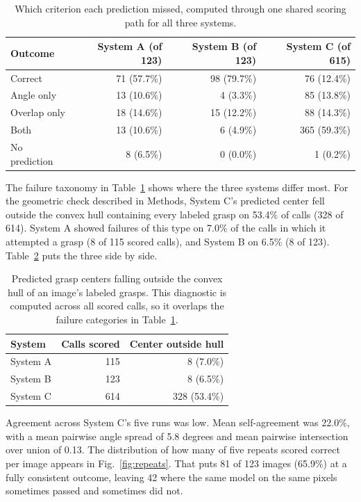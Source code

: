 \documentclass[12pt,letterpaper]{article}
\begin{document}
\begin{table}[H]
\centering
\caption{Which criterion each prediction missed, computed through one
shared scoring path for all three systems.}
\label{tab:taxonomy}
\begin{tabular}{lrrr}
\toprule
Outcome & System A (of 123) & System B (of 123) & System C (of 615) \\
\midrule
Correct       & 71 (57.7\%) & 98 (79.7\%) & 76 (12.4\%) \\
Angle only    & 13 (10.6\%) &  4 (3.3\%)  & 85 (13.8\%) \\
Overlap only  & 18 (14.6\%) & 15 (12.2\%) & 88 (14.3\%) \\
Both          & 13 (10.6\%) &  6 (4.9\%)  & 365 (59.3\%) \\
No prediction &  8 (6.5\%)  &  0 (0.0\%)  & 1 (0.2\%) \\
\bottomrule
\end{tabular}
\end{table}

The failure taxonomy in Table~\ref{tab:taxonomy} shows where the three
systems differ most. For the geometric check described in Methods,
System C's predicted center fell outside the convex hull containing
every labeled grasp on 53.4\% of calls (328 of 614). System A showed
failures of this type on 7.0\% of the calls in which it attempted a
grasp (8 of 115 scored calls), and System B on 6.5\% (8 of 123).
Table~\ref{tab:hull} puts the three side by side.

\begin{table}[H]
\centering
\caption{Predicted grasp centers falling outside the convex hull of an
image's labeled grasps. This diagnostic is computed across all scored calls, so it overlaps the failure categories in Table~\ref{tab:taxonomy}.}
\label{tab:hull}
\begin{tabular}{lrr}
\toprule
System & Calls scored & Center outside hull \\
\midrule
System A &  115 &   8 (7.0\%)  \\
System B &  123 &   8 (6.5\%)  \\
System C &  614 & 328 (53.4\%) \\
\bottomrule
\end{tabular}
\end{table}

Agreement across System C's five runs was low. Mean self-agreement was
22.0\%, with a mean pairwise angle spread of 5.8 degrees and mean
pairwise intersection over union of 0.13. The distribution of how many
of five repeats scored correct per image appears in
Fig.~\ref{fig:repeats}. That puts 81 of 123 images (65.9\%) at a fully
consistent outcome, leaving 42 where the same model on the same pixels
sometimes passed and sometimes did not.
\end{document}
